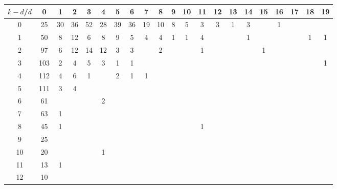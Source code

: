 \documentclass{article}[12pt]
\begin{document}
\begin{landscape}

\begin{table}[h]\footnotesize
{\centering
\begin{tabular}{|c|c|
c|c|c|c|c|c|c|c|c|c|c|c|c|c|c|c|c|c|c|}
  \hline
  $k-d$/$d$ 
 & 0 & 1 & 2 & 3 & 4 & 5 & 6 & 7 & 8 & 9 & 10 & 11 & 12 & 13 & 14 & 15 & 16 & 17 & 18 & 19\\

  \hline
  \hline

0  & 25 & 30 & 36 & 52 & 28 & 39 & 36 & 19 & 10 & 8 & 5 & 3 & 3 & 1 & 3 &  & 1 &  &  & \\

1  & 50 & 8 & 12 & 6 & 8 & 9 & 5 & 4 & 4 & 1 & 1 & 4 &  &  & 1 &  &  &  & 1 & 1\\

2  & 97 & 6 & 12 & 14 & 12 & 3 & 3 &  & 2 &  &  & 1 &  &  &  & 1 &  &  &  & \\

3  & 103 & 2 & 4 & 5 & 3 & 1 & 1 &  &  &  &  &  &  &  &  &  &  &  &  & 1\\

4  & 112 & 4 & 6 & 1 &  & 2 & 1 & 1 &  &  &  &  &  &  &  &  &  &  &  & \\

5  & 111 & 3 & 4 &  &  &  &  &  &  &  &  &  &  &  &  &  &  &  &  & \\

6  & 61 &  &  &  & 2 &  &  &  &  &  &  &  &  &  &  &  &  &  &  & \\

7  & 63 & 1 &  &  &  &  &  &  &  &  &  &  &  &  &  &  &  &  &  & \\

8  & 45 & 1 &  &  &  &  &  &  &  &  &  & 1 &  &  &  &  &  &  &  & \\

9  & 25 &  &  &  &  &  &  &  &  &  &  &  &  &  &  &  &  &  &  & \\

10  & 20 &  &  &  & 1 &  &  &  &  &  &  &  &  &  &  &  &  &  &  & \\

11  & 13 & 1 &  &  &  &  &  &  &  &  &  &  &  &  &  &  &  &  &  & \\

12  & 10 &  &  &  &  &  &  &  &  &  &  &  &  &  &  &  &  &  &  & \\


\end{tabular}}
\end{table}
\end{landscape}
\end{document}
